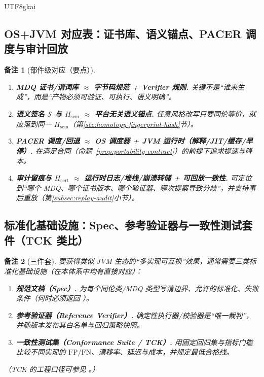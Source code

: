 \documentclass[12pt]{article}
\newtheorem{remark}{备注}[section]
\newcommand{\code}[1]{\path{#1}}
\begin{document}
\begin{CJK*}{UTF8}{gkai}
\subsection{OS+JVM 对应表：证书库、语义锚点、PACER 调度与审计回放}
\label{subsec:osjvm-mapping}

\begin{remark}[部件级对应（要点）]
\begin{enumerate}
  \item \textbf{MDQ 证书/谓词库 $\approx$ 字节码规范 + Verifier 规则.}
  关键不是“谁来生成”，而是“产物必须可验证、可执行、语义明确”。
  \item \textbf{语义签名 $\mathcal{S}$ 与 $H_{\mathrm{sem}}$ $\approx$ 平台无关语义锚点.}
  任意风格改写只要同伦等价，就应落到同一 $H_{\mathrm{sem}}$（第\ref{sec:homotopy-fingerprint-hash}节）。
  \item \textbf{PACER 调度/回退 $\approx$ OS 调度器 + JVM 运行时（解释/JIT/缓存/早停）.}
  在满足合同（命题~\ref{prop:portability-contract}）的前提下追求提速与降本。
  \item \textbf{审计留痕与 $H_{\mathrm{cert}}$ $\approx$ 运行时日志/堆栈/崩溃转储 + 可回放一致性.}
  可定位到“哪个 MDQ、哪个证书版本、哪个验证器、哪次提案导致分歧”，并支持事后重放（第\ref{subsec:replay-audit}小节）。
\end{enumerate}
\end{remark}

\subsection{标准化基础设施：Spec、参考验证器与一致性测试套件（TCK 类比）}
\label{subsec:spec-verifier-tck}

\begin{remark}[三件套]
要获得类似 \textsf{JVM} 生态的“多实现可互换”效果，通常需要三类标准化基础设施（在本体系中均有直接对应）：
\begin{enumerate}
  \item \textbf{规范文档（Spec）.}
  为每个同伦类/MDQ 类型写清边界、允许的标准化、失败条件（何时必须返回 \code{ok:false}）。
  \item \textbf{参考验证器（Reference Verifier）.}
  确定性执行器/校验器是“唯一裁判”，并随版本发布其白名单与回归策略快照。
  \item \textbf{一致性测试集（Conformance Suite / TCK）.}
  用固定回归集与指标门槛比较不同实现的 $\mathrm{FP}/\mathrm{FN}$、漂移率、延迟与成本，并规定最低合格线。
\end{enumerate}
（TCK 的工程口径可参见 \cite{java-tck}。）
\end{remark}


\end{CJK*}
\end{document}
